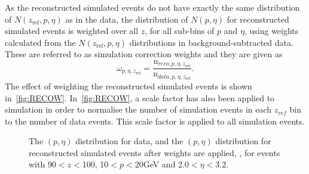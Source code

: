 As the reconstructed simulated events do not have exactly the same distribution of $N(z_{\textrm{ref}},p,\eta)$ as in the data, the distribution of $N(p, \eta)$ for reconstructed simulated events is weighted over all $z$, for all sub-bins of $p$ and $\eta$, using weights calculated from the $N(z_{\textrm{ref}},p,\eta)$ distributions in background-subtracted data. These are referred to as simulation correction weights and they are given as 
\begin{equation}
\label{eq:recow}
\omega_{p,\eta, z_{\textrm{ref}}} = \frac{\textrm{n}_{reco, p, \eta, z_{\textrm{ref}}}}{\textrm{n}_{data, p, \eta, z_{\textrm{ref}}}}.
\end{equation}
The effect of weighting the reconstructed simulated events is shown in~\autoref{fig:RECOW}. In~\autoref{fig:RECOW}, a scale factor has also been applied to simulation in order to normalise the number of simulation events in each $z_{ref}$ bin to the number of data events. This scale factor is applied to all simulation events. 
\begin{figure}[h!]
  \centering
  \hspace*{-1cm}
\caption{The $(p, \eta)$  distribution for data, \protect{} and the $(p, \eta)$  distribution for reconstructed simulated events after weights are applied, \protect{}, for events with 90$<z<$100\mm,  10$<p<$20\:GeV and 2.0$<\eta<$3.2.}
  \label{fig:RECOW}
\end{figure}






